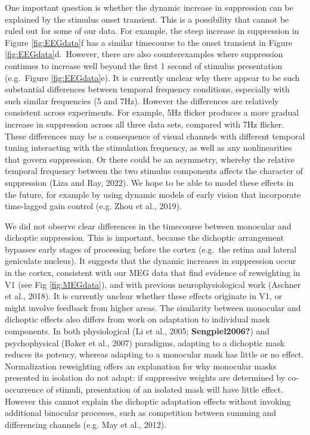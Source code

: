 \documentclass[
]{article}
\begin{document}
One important question is whether the dynamic increase in suppression can be explained by the stimulus onset transient. This is a possibility that cannot be ruled out for some of our data. For example, the steep increase in suppression in Figure \ref{fig:EEGdata}f has a similar timecourse to the onset transient in Figure \ref{fig:EEGdata}d.~However, there are also counterexamples where suppression continues to increase well beyond the first 1 second of stimulus presentation (e.g.~Figure \ref{fig:EEGdata}e). It is currently unclear why there appear to be such substantial differences between temporal frequency conditions, especially with such similar frequencies (5 and 7Hz). However the differences are relatively consistent across experiments. For example, 5Hz flicker produces a more gradual increase in suppression across all three data sets, compared with 7Hz flicker. These differences may be a consequence of visual channels with different temporal tuning interacting with the stimulation frequency, as well as any nonlinearities that govern suppression. Or there could be an asymmetry, whereby the relative temporal frequency between the two stimulus components affects the character of suppression (Liza and Ray, 2022). We hope to be able to model these effects in the future, for example by using dynamic models of early vision that incorporate time-lagged gain control (e.g. Zhou et al., 2019).

We did not observe clear differences in the timecourse between monocular and dichoptic suppression. This is important, because the dichoptic arrangement bypasses early stages of processing before the cortex (e.g.~the retina and lateral geniculate nucleus). It suggests that the dynamic increases in suppression occur in the cortex, consistent with our MEG data that find evidence of reweighting in V1 (see Fig \ref{fig:MEGdata}), and with previous neurophysiological work (Aschner et al., 2018). It is currently unclear whether these effects originate in V1, or might involve feedback from higher areas. The similarity between monocular and dichoptic effects also differs from work on adaptation to individual mask components. In both physiological (Li et al., 2005; \textbf{Sengpiel2006?}) and psychophysical (Baker et al., 2007) paradigms, adapting to a dichoptic mask reduces its potency, whereas adapting to a monocular mask has little or no effect. Normalization reweighting offers an explanation for why monocular masks presented in isolation do not adapt: if suppressive weights are determined by co-occurrence of stimuli, presentation of an isolated mask will have little effect. However this cannot explain the dichoptic adaptation effects without invoking additional binocular processes, such as competition between summing and differencing channels (e.g. May et al., 2012).
\end{document}

